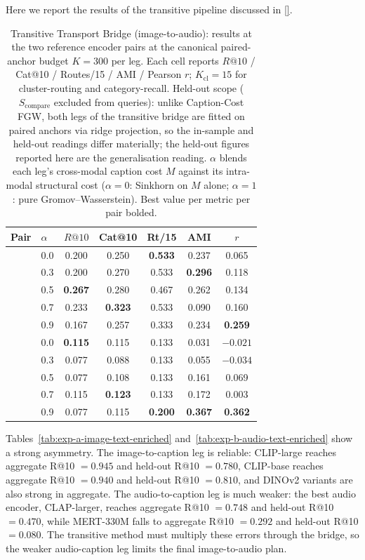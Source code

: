 Here we report the results of the transitive pipeline discussed in \ref{}.
\begin{table}[!ht]
\centering
\footnotesize
\setlength{\tabcolsep}{5pt}
\begin{tabular}{@{}ll ccccc@{}}
\toprule
Pair & $\alpha$ & $R@10$ & Cat@10 & Rt/15 & AMI & $r$ \\
\midrule
{}
  & 0.0 & 0.200 & 0.250 & \textbf{0.533} & 0.237 & 0.065 \\
  & 0.3 & 0.200 & 0.270 & 0.533 & \textbf{0.296} & 0.118 \\
  & 0.5 & \textbf{0.267} & 0.280 & 0.467 & 0.262 & 0.134 \\
  & 0.7 & 0.233 & \textbf{0.323} & 0.533 & 0.090 & 0.160 \\
  & 0.9 & 0.167 & 0.257 & 0.333 & 0.234 & \textbf{0.259} \\
\midrule
{}
  & 0.0 & \textbf{0.115} & 0.115 & 0.133 & 0.031 & $-0.021$ \\
  & 0.3 & 0.077 & 0.088 & 0.133 & 0.055 & $-0.034$ \\
  & 0.5 & 0.077 & 0.108 & 0.133 & 0.161 & 0.069 \\
  & 0.7 & 0.115 & \textbf{0.123} & 0.133 & 0.172 & 0.003 \\
  & 0.9 & 0.077 & 0.115 & \textbf{0.200} & \textbf{0.367} & \textbf{0.362} \\
\bottomrule
\end{tabular}
\caption{Transitive Transport Bridge (image-to-audio): results at
the two reference encoder pairs at the canonical paired-anchor
budget $K = 300$ per leg. Each cell reports
$R@10$ / Cat@10 / Routes/15 / AMI / Pearson $r$;
$K_{\mathrm{cl}}=15$ for cluster-routing and category-recall.
Held-out scope ($S_{\text{compare}}$ excluded from queries):
unlike Caption-Cost FGW, both legs of the transitive bridge are
fitted on paired anchors via ridge projection, so the in-sample
and held-out readings differ materially; the held-out figures
reported here are the generalisation reading. $\alpha$ blends each
leg's cross-modal caption cost $M$ against its intra-modal
structural cost ($\alpha=0$: Sinkhorn on $M$ alone; $\alpha=1$:
pure Gromov--Wasserstein). Best value per metric per pair bolded.}
\label{tab:transitive-alpha-merged}
\end{table}
Tables~\ref{tab:exp-a-image-text-enriched} and~\ref{tab:exp-b-audio-text-enriched} show a strong asymmetry. The image-to-caption leg is reliable: CLIP-large reaches aggregate R@10 $=0.945$ and held-out R@10 $=0.780$, CLIP-base reaches aggregate R@10 $=0.940$ and held-out R@10 $=0.810$, and DINOv2 variants are also strong in aggregate. The audio-to-caption leg is much weaker: the best audio encoder, CLAP-larger, reaches aggregate R@10 $=0.748$ and held-out R@10 $=0.470$, while MERT-330M falls to aggregate R@10 $=0.292$ and held-out R@10 $=0.080$. The transitive method must multiply these errors through the bridge, so the weaker audio-caption leg limits the final image-to-audio plan.

